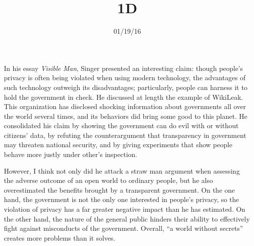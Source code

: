 \documentclass{writing}
\title{1D}
\date{01/19/16}
\begin{document}
\maketitle

In his essay \emph{Visible Man}, Singer presented an interesting claim: though people’s privacy is often being violated when using modern technology, the advantages of such technology outweigh its disadvantages; particularly, people can harness it to hold the government in check. He discussed at length the example of WikiLeak. This organization has disclosed shocking information about governments all over the world several times, and its behaviors did bring some good to this planet. He consolidated his claim by showing the government can do evil with or without citizens’ data, by refuting the counterargument that transparency in government may threaten national security, and by giving experiments that show people behave more justly under other’s inspection.

However, I think not only did he attack a straw man argument when assessing the adverse outcome of an open world to ordinary people, but he also overestimated the benefits brought by a transparent government. On the one hand, the government is not the only one interested in people’s privacy, so the violation of privacy has a far greater negative impact than he has estimated. On the other hand, the nature of the general public hinders their ability to effectively fight against misconducts of the government. Overall, “a world without secrets” creates more problems than it solves.
\end{document}
